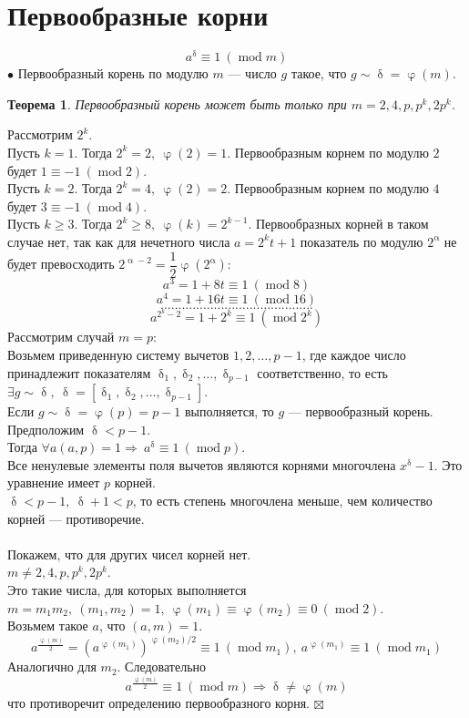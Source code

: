 \documentclass[a4paper, 12pt]{article}
\newtheorem*{theorem}{Теорема}
\newenvironment{Proof}
{\par\noindent{$\blacklozenge$}}
{\hfill$\scriptstyle\boxtimes$}
\renewcommand{\mod}{\operatorname{mod}}
\renewcommand{\alpha}{\upalpha}
\renewcommand{\delta}{\updelta}
\renewcommand{\varphi}{\upvarphi}
\begin{document}
\section{Первообразные корни}
$$a^\delta \equiv 1 \ (\mod m)$$
$\bullet$ Первообразный корень по модулю $m$ --- число $g$ такое, что $g \sim \delta = \varphi(m)$.
\begin{theorem}
    Первообразный корень может быть только при $m=2, 4, p, p^k, 2p^k$.
\end{theorem}
\begin{Proof}
    Рассмотрим $2^k$.\\
    Пусть $k=1$. Тогда $2^k = 2, \ \varphi(2) = 1$. Первообразным корнем по модулю $2$ будет $1 \equiv -1 \ (\mod 2)$.\\
    Пусть $k=2$. Тогда $2^k = 4, \ \varphi(2) = 2$. Первообразным корнем по модулю $4$ будет $3 \equiv -1 \ (\mod 4)$.\\
    Пусть $k \geq 3$. Тогда $2^k \geq 8, \ \varphi(k)=2^{k-1}$.
    Первообразных корней в таком случае нет, так как для нечетного числа $a=2^kt+1$ показатель по модулю $2^\alpha$ не будет превосходить $2^{\alpha-2}=\dfrac{1}{2}\varphi(2^\alpha)$:
    $$a^3 = 1 + 8t \equiv 1 \ (\mod 8)$$
    $$a^4 = 1 + 16t \equiv 1 \ (\mod 16)$$
    $$...........................................$$
    $$a^{2^k-2} = 1 + 2^k \equiv 1 \ (\mod 2^k)$$
    Рассмотрим случай $m=p$:\\
    Возьмем приведенную систему вычетов $1, 2,\dots, p-1$, где каждое число принадлежит показателям $\delta_1,\delta_2,\dots,\delta_{p-1}$ соответственно, то есть $\exists g \sim \delta, \ \delta = [\delta_1,\delta_2,\dots,\delta_{p-1}]$.\\
    Если $g \sim \delta = \varphi(p) = p-1$ выполняется, то $g$ --- первообразный корень.\\
    Предположим $\delta < p-1$.\\
    Тогда $\forall a (a, p) = 1 \Rightarrow \ a^\delta \equiv 1 \ (\mod p)$.\\
    Все ненулевые элементы поля вычетов являются корнями многочлена $x^\delta-1$. Это уравнение имеет $p$ корней.\\
    $\delta < p-1, \ \delta+1<p$, то есть степень многочлена меньше, чем количество корней --- противоречие.\\\\
    Покажем, что для других чисел корней нет.\\
    $m \neq 2, 4, p, p^k, 2p^k$.\\
    Это такие числа, для которых выполняется $m=m_1m_2, \ (m_1,m_2)=1, \ \varphi(m_1) \equiv \varphi(m_2) \equiv 0 \ (\mod 2)$.\\
    Возьмем такое $a$, что $(a, m) = 1$.
    $$a^{\frac{\varphi(m)}{2}} = (a^{\varphi(m_1)})^{\varphi(m_2)/2} \equiv 1 \ (\mod m_1), \ a^{\varphi(m_1)} \equiv 1 \ (\mod m_1)$$
    Аналогично для $m_2$. Следовательно $$a^{\frac{\varphi(m)}{2}} \equiv 1 \ (\mod m)\Rightarrow \delta \neq \varphi(m)$$
    что противоречит определению первообразного корня.
\end{Proof}
\end{document}
